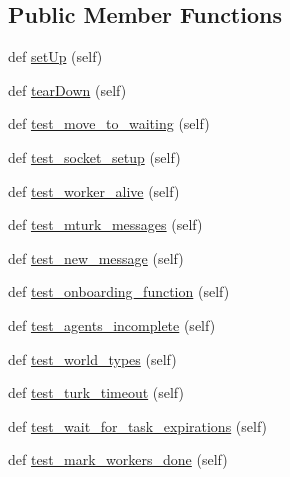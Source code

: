 \subsection*{Public Member Functions}
\begin{DoxyCompactItemize}
\item 
def \hyperlink{classparlai_1_1mturk_1_1core_1_1dev_1_1test_1_1test__mturk__manager_1_1TestMTurkManagerUnitFunctions_adaf4bbd8601fc1df928254c5bab460d7}{set\+Up} (self)
\item 
def \hyperlink{classparlai_1_1mturk_1_1core_1_1dev_1_1test_1_1test__mturk__manager_1_1TestMTurkManagerUnitFunctions_a91b705565575db1f108703e1559409b1}{tear\+Down} (self)
\item 
def \hyperlink{classparlai_1_1mturk_1_1core_1_1dev_1_1test_1_1test__mturk__manager_1_1TestMTurkManagerUnitFunctions_a9842f2d20f095174c0c1e690a14f1311}{test\+\_\+move\+\_\+to\+\_\+waiting} (self)
\item 
def \hyperlink{classparlai_1_1mturk_1_1core_1_1dev_1_1test_1_1test__mturk__manager_1_1TestMTurkManagerUnitFunctions_a55a68e0d5f5570efbe667d590bd37df9}{test\+\_\+socket\+\_\+setup} (self)
\item 
def \hyperlink{classparlai_1_1mturk_1_1core_1_1dev_1_1test_1_1test__mturk__manager_1_1TestMTurkManagerUnitFunctions_a0a941d24785aa95bd1754ec985899eae}{test\+\_\+worker\+\_\+alive} (self)
\item 
def \hyperlink{classparlai_1_1mturk_1_1core_1_1dev_1_1test_1_1test__mturk__manager_1_1TestMTurkManagerUnitFunctions_af68aff7c18fb80c0c3b9dcc683e84ffa}{test\+\_\+mturk\+\_\+messages} (self)
\item 
def \hyperlink{classparlai_1_1mturk_1_1core_1_1dev_1_1test_1_1test__mturk__manager_1_1TestMTurkManagerUnitFunctions_a82e736fd03c5f23710bba01e9335f6b8}{test\+\_\+new\+\_\+message} (self)
\item 
def \hyperlink{classparlai_1_1mturk_1_1core_1_1dev_1_1test_1_1test__mturk__manager_1_1TestMTurkManagerUnitFunctions_a9439aba4f729dacb09ac64fd0dccbf0f}{test\+\_\+onboarding\+\_\+function} (self)
\item 
def \hyperlink{classparlai_1_1mturk_1_1core_1_1dev_1_1test_1_1test__mturk__manager_1_1TestMTurkManagerUnitFunctions_a6f0c764c9678fa486fefb355ce5896f1}{test\+\_\+agents\+\_\+incomplete} (self)
\item 
def \hyperlink{classparlai_1_1mturk_1_1core_1_1dev_1_1test_1_1test__mturk__manager_1_1TestMTurkManagerUnitFunctions_aafa25792d9c1368be3f2df182a6109f1}{test\+\_\+world\+\_\+types} (self)
\item 
def \hyperlink{classparlai_1_1mturk_1_1core_1_1dev_1_1test_1_1test__mturk__manager_1_1TestMTurkManagerUnitFunctions_a19c8394ebe1f54d5cf9b1bcad6920ec9}{test\+\_\+turk\+\_\+timeout} (self)
\item 
def \hyperlink{classparlai_1_1mturk_1_1core_1_1dev_1_1test_1_1test__mturk__manager_1_1TestMTurkManagerUnitFunctions_a6fe5e5af6b831868b8570f8015efafea}{test\+\_\+wait\+\_\+for\+\_\+task\+\_\+expirations} (self)
\item 
def \hyperlink{classparlai_1_1mturk_1_1core_1_1dev_1_1test_1_1test__mturk__manager_1_1TestMTurkManagerUnitFunctions_ad8cf3af0039dd5eea8fb280b3375c3c4}{test\+\_\+mark\+\_\+workers\+\_\+done} (self)
\end{DoxyCompactItemize}
